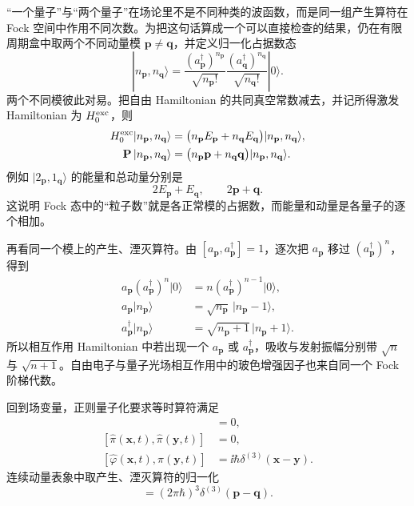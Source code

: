 \begin{exbox}
“一个量子”与“两个量子”在场论里不是不同种类的波函数，而是同一组产生算符在 Fock 空间中作用不同次数。为把这句话算成一个可以直接检查的结果，仍在有限周期盒中取两个不同动量模 $\mathbf p\neq\mathbf q$，并定义归一化占据数态
\begin{equation*}
 |n_{\mathbf p},n_{\mathbf q}\rangle
 =\frac{(a_{\mathbf p}^\dagger)^{n_{\mathbf p}}}{\sqrt{n_{\mathbf p}!}}
  \frac{(a_{\mathbf q}^\dagger)^{n_{\mathbf q}}}{\sqrt{n_{\mathbf q}!}}|0\rangle .
\end{equation*}
两个不同模彼此对易。把自由 Hamiltonian 的共同真空常数减去，并记所得激发 Hamiltonian 为 $H_0^{\rm exc}$，则
\begin{align*}
 H_0^{\rm exc}|n_{\mathbf p},n_{\mathbf q}\rangle
 &=\bigl(n_{\mathbf p}E_{\mathbf p}+n_{\mathbf q}E_{\mathbf q}\bigr)
 |n_{\mathbf p},n_{\mathbf q}\rangle,\\
 \mathbf P\,|n_{\mathbf p},n_{\mathbf q}\rangle
 &=\bigl(n_{\mathbf p}\mathbf p+n_{\mathbf q}\mathbf q\bigr)
 |n_{\mathbf p},n_{\mathbf q}\rangle.
\end{align*}
例如 $|2_{\mathbf p},1_{\mathbf q}\rangle$ 的能量和总动量分别是
\begin{equation*}
 2E_{\mathbf p}+E_{\mathbf q},
 \qquad
 2\mathbf p+\mathbf q.
\end{equation*}
这说明 Fock 态中的“粒子数”就是各正常模的占据数，而能量和动量是各量子的逐个相加。

再看同一个模上的产生、湮灭算符。由 $[a_{\mathbf p},a_{\mathbf p}^\dagger]=1$，逐次把 $a_{\mathbf p}$ 移过 $(a_{\mathbf p}^\dagger)^n$，得到
\begin{align*}
 a_{\mathbf p}(a_{\mathbf p}^\dagger)^n|0\rangle
 &=n(a_{\mathbf p}^\dagger)^{n-1}|0\rangle,\\
 a_{\mathbf p}|n_{\mathbf p}\rangle
 &=\sqrt{n_{\mathbf p}}\,|n_{\mathbf p}-1\rangle,\\
 a_{\mathbf p}^\dagger|n_{\mathbf p}\rangle
 &=\sqrt{n_{\mathbf p}+1}\,|n_{\mathbf p}+1\rangle.
\end{align*}
所以相互作用 Hamiltonian 中若出现一个 $a_{\mathbf p}$ 或 $a_{\mathbf p}^\dagger$，吸收与发射振幅分别带 $\sqrt n$ 与 $\sqrt{n+1}$。自由电子与量子光场相互作用中的玻色增强因子也来自同一个 Fock 阶梯代数。
\end{exbox}

回到场变量，正则量子化要求等时算符满足
\begin{align}
 [\hat\varphi(\mathbf x,t),\hat\varphi(\mathbf y,t)]&=0,\\
 [\hat\pi(\mathbf x,t),\hat\pi(\mathbf y,t)]&=0,\\
 [\hat\varphi(\mathbf x,t),\hat\pi(\mathbf y,t)]
 &=\ii\hbar\delta^{(3)}(\mathbf x-\mathbf y).
 \label{eq:kg-canonical-r2}
\end{align}
连续动量表象中取产生、湮灭算符的归一化
\begin{equation}
 [\hat a(\mathbf p),\hat a^\dagger(\mathbf q)]
 =(2\pi\hbar)^3\delta^{(3)}(\mathbf p-\mathbf q).
 \label{eq:scalar-aa-r2}
\end{equation}

